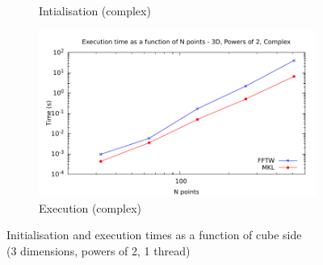 \documentclass[12pt, a4paper]{article}
\begin{document}
\begin{figure}[H]
\begin{subfigure}{.5\textwidth}
\caption{Intialisation (complex)}
\label{3DPOW2CI}
\end{subfigure}%
\begin{subfigure}{.5\textwidth}
\centering
\includegraphics[width=.9\linewidth]{graphs/3d-pow2-exec-c.pdf}
\caption{Execution (complex)}
\label{3DPOW2C}
\end{subfigure}
\caption{Initialisation and execution times as a function of cube side\\(3 dimensions, powers of 2, 1 thread)}
\label{3DPOW2}
\end{figure}
\end{document}
